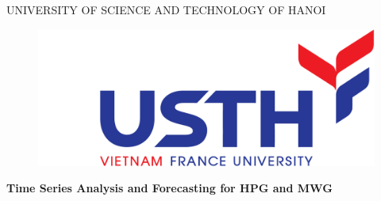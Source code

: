 \documentclass[14pt]{extreport}
\newcommand{\fontset}[3]{\fontsize{#1}{#2}\selectfont {#3}}
\begin{document}
\begin{titlepage}
    \begin{center}
        \begin{adjustwidth}{-100pt}{-100pt}
            \centering
            {\fontsize{20}{15}\selectfont UNIVERSITY OF SCIENCE AND TECHNOLOGY OF HANOI}
            \vspace{1cm}
            \newline
            \begin{figure}[H]
                \centering
                \includegraphics[max width=\linewidth]{Title logo/Logopad.png}
            \end{figure}
            \vspace{1cm}

        \end{adjustwidth}
        \LARGE \bfseries Time Series Analysis and Forecasting for HPG and MWG

        \vspace{2cm}
        \begin{adjustwidth}{-50pt}{-00pt}
            \begin{minipage}{0.45\linewidth}
                \raggedleft
                \fontset{15}{30}{

                }
            \end{minipage}\hfill
            \begin{minipage}{0.45\linewidth}
                \fontset{15}{30}{

                }
            \end{minipage}
        \end{adjustwidth}
        \date{}
    \end{center}
\end{titlepage}
\end{document}
